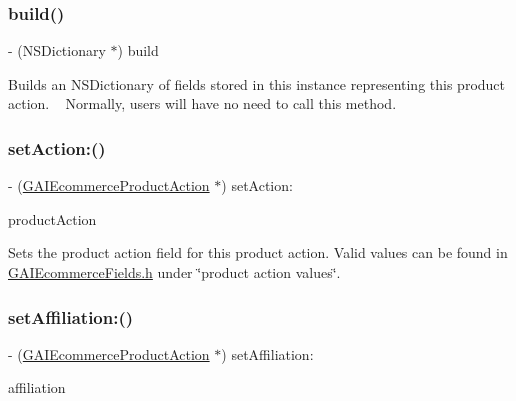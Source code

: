 \subsubsection{\texorpdfstring{build()}{build()}}
{\footnotesize\ttfamily -\/ (N\+S\+Dictionary $\ast$) build \begin{DoxyParamCaption}{ }\end{DoxyParamCaption}}

Builds an N\+S\+Dictionary of fields stored in this instance representing this product action. ~\newline
 Normally, users will have no need to call this method. \mbox{\label{interface_g_a_i_ecommerce_product_action_ac8891a6025102bd1b8e2071c2ee92d64}} 
\subsubsection{\texorpdfstring{set\+Action\+:()}{setAction:()}}
{\footnotesize\ttfamily -\/ (\hyperlink{interface_g_a_i_ecommerce_product_action}{G\+A\+I\+Ecommerce\+Product\+Action} $\ast$) set\+Action\+: \begin{DoxyParamCaption}\item[{(N\+S\+String $\ast$)}]{product\+Action }\end{DoxyParamCaption}}

Sets the product action field for this product action. Valid values can be found in \hyperlink{_g_a_i_ecommerce_fields_8h}{G\+A\+I\+Ecommerce\+Fields.\+h} under \char`\"{}product action values\char`\"{}. \mbox{\label{interface_g_a_i_ecommerce_product_action_acb7fd9fce90be149a9dfde99a7ccb7f1}} 
\subsubsection{\texorpdfstring{set\+Affiliation\+:()}{setAffiliation:()}}
{\footnotesize\ttfamily -\/ (\hyperlink{interface_g_a_i_ecommerce_product_action}{G\+A\+I\+Ecommerce\+Product\+Action} $\ast$) set\+Affiliation\+: \begin{DoxyParamCaption}\item[{(N\+S\+String $\ast$)}]{affiliation }\end{DoxyParamCaption}}


